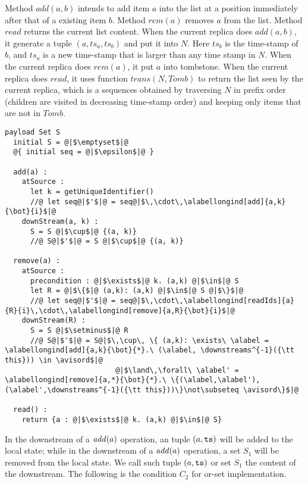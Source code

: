 Method $\mathit{add}(a,b)$ intends to add item $a$ into the list at a position immediately after that of a existing item $b$. Method $\mathit{rem}(a)$ removes $a$ from the list. Method $\mathit{read}$ returns the current list content. When the current replica does $\mathit{add}(a,b)$, it generate a tuple $(a,ts_a,ts_b)$ and put it into $N$. Here $ts_b$ is the time-stamp of $b$, and $ts_a$ is a new time-stamp that is larger than any time stamp in $N$. When the current replica does $\mathit{rem}(a)$, it put $a$ into tombstone. When the current replica does $\mathit{read}$, it uses function $\mathit{trans}(N,\mathit{Tomb})$ to return the list seen by the current replica, which is a sequences obtained by traversing $N$ in prefix order (children are visited in decreasing time-stamp order) and keeping only items that are not in $\mathit{Tomb}$.

\begin{lstlisting}[caption={Pseudo-code of the or-set CRDT}, captionpos=b,label={lst:or-set}]
  payload Set S
  initial S = @|$\emptyset$|@
  @{ initial seq = @|$\epsilon$|@ }

  add(a) :
    atSource :
      let k = getUniqueIdentifier()
      //@ let seq@|$'$|@ = seq@|$\,\cdot\,\alabellongind[add]{a,k}{\bot}{i}$|@ 
    downStream(a, k) :
      S = S @|$\cup$|@ {(a, k)}
      //@ S@|$'$|@ = S @|$\cup$|@ {(a, k)} 

  remove(a) :
    atSource :
      precondition : @|$\exists$|@ k. (a,k) @|$\in$|@ S
      let R = @|$\{$|@ (a,k): (a,k) @|$\in$|@ S @|$\}$|@
      //@ let seq@|$'$|@ = seq@|$\,\cdot\,\alabellongind[readIds]{a}{R}{i}\,\cdot\,\alabellongind[remove]{a,R}{\bot}{i}$|@ 
    downStream(R) :
      S = S @|$\setminus$|@ R
      //@ S@|$'$|@ = S@|$\,\cup\, \{ (a,k): \exists\ \alabel = \alabellongind[add]{a,k}{\bot}{*}.\ (\alabel, \downstreams^{-1}({\tt this})) \in \avisord$|@ 
      	                  @|$\land\,\forall\ \alabel' = \alabellongind[remove]{a,*}{\bot}{*}.\ \{(\alabel,\alabel'),(\alabel',\downstreams^{-1}({\tt this}))\}\not\subseteq \avisord\}$|@ 

  read() :
    return {a : @|$\exists$|@ k. (a,k) @|$\in$|@ S}
\end{lstlisting}


In the downstream of a $\alabellongNoret[\mathit{add}]{\argv}$ operation, an tuple $(\argv,\ats)$ will be added to the local state; while in the downstream of a $\alabellongNoret[\mathit{add}]{\argv}$ operation, a set $S_1$ will be removed from the local state. We call such tuple $(\argv,\ats)$ or set $S_1$ the content of the downstream. The following is the condition $C_2$ for or-set implementation.


